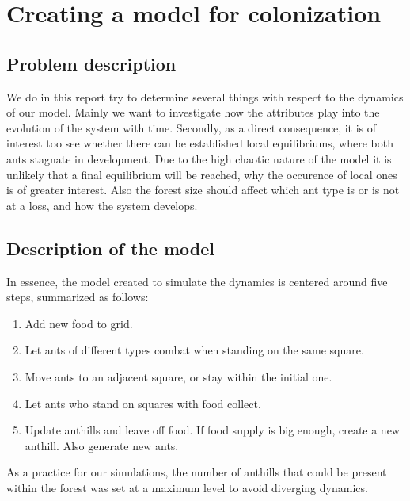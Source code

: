 \documentclass[a4paper,12pt]{article}
\theoremstyle{plain}
\theoremstyle{definition}
\begin{document}
\newpage

\section{Creating a model for colonization}
	\setcounter{equation}{0}
   \subsection{Problem description}
      We do in this report try to determine several things with respect to the
      dynamics of our model. Mainly we want to investigate how the attributes
      play into the evolution of the system with time. Secondly, as a direct
      consequence, it is of interest too see whether there can be established
      local equilibriums, where both ants stagnate in development. Due to the
      high chaotic nature of the model it is unlikely that a final equilibrium
      will be reached, why the occurence of local ones is of greater interest.   
      Also the forest size should affect which ant type is or is not at a loss,
      and how the system develops.
   
   \subsection{Description of the model}
      In essence, the model created to simulate the dynamics is centered around
      five steps, summarized as follows:
      \begin{enumerate}
         \item Add new food to grid.
         \item Let ants of different types combat when standing on the same
            square.
         \item Move ants to an adjacent square, or stay within the initial one.
         \item Let ants who stand on squares with food collect.
         \item Update anthills and leave off food. If food supply is big enough, 
            create a new anthill. Also generate new ants.
      \end{enumerate}
      As a practice for our simulations, the number of anthills that could be
      present within the forest was set at a maximum level to avoid diverging
      dynamics. 
\end{document}
